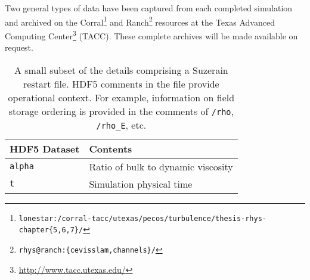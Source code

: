 \label{sec:archiving}


Two general types of data have been captured from each completed
simulation and archived on the Corral\footnote{%
    \texttt{lonestar:/corral-tacc/utexas/pecos/turbulence/thesis-rhys-chapter\{5,6,7\}/}
}
and Ranch\footnote{%
    \texttt{rhys@ranch:\{cevisslam,channels\}/}
}
resources at the Texas Advanced Computing Center\footnote{%
    \url{http://www.tacc.utexas.edu/}
}
(TACC).  These complete archives will be made available on request. 

\begin{table}
\centering
\caption[Instantaneous fields and other details comprising a restart file]{%
  A small subset of the details comprising a Suzerain restart file.
  HDF5 comments in the file provide operational context.  For example,
  information on field storage ordering is provided in the comments of
  \texttt{/rho}, \texttt{/rho\_E}, etc.\label{tbl:restartfile}
}
\begin{small}
\begin{tabular}{p{}|p{}}
HDF5 Dataset & Contents \\ \hline \hline
\texttt{alpha                 } & Ratio of bulk to dynamic viscosity \\
\texttt{t                     } & Simulation physical time \\
\end{tabular}
\end{small}
\end{table}

